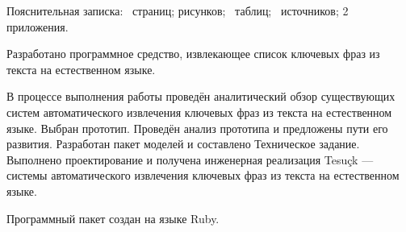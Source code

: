 \Referat
Пояснительная записка: \totalpages~страниц; \totalfigures рисунков;
\totaltables~таблиц; \totalbibs~источников; 2 приложения.

Разработано программное средство, извлекающее список ключевых
фраз из текста на естественном языке.

В процессе выполнения работы проведён аналитический обзор
существующих систем автоматического извлечения ключевых фраз из
текста на естественном языке. Выбран прототип. Проведён анализ
прототипа и предложены пути его развития. Разработан пакет моделей и
составлено Техническое задание. Выполнено проектирование и
получена инженерная реализация Tesuçk — системы автоматического
извлечения ключевых фраз из текста на естественном языке.

Программный пакет создан на языке Ruby.

